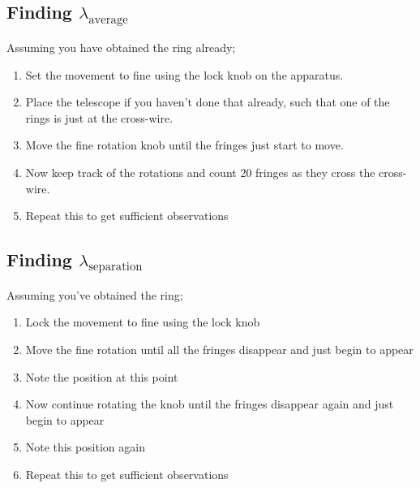 	\subsection{Finding $\lambda_\text{average}$}
		Assuming you have obtained the ring already;
		\begin{enumerate}
			\item Set the movement to fine using the lock knob on the apparatus.
			\item Place the telescope if you haven't done that already, such that one of the rings is just at the cross-wire.
			\item Move the fine rotation knob until the fringes just start to move.
			\item Now keep track of the rotations and count 20 fringes as they cross the cross-wire.
			\item Repeat this to get sufficient observations			
		\end{enumerate}
	\subsection{Finding $\lambda_\text{separation}$}
		Assuming you've obtained the ring;
		\begin{enumerate}
			\item Lock the movement to fine using the lock knob
			\item Move the fine rotation until all the fringes disappear and just begin to appear
			\item Note the position at this point
			\item Now continue rotating the knob until the fringes disappear again and just begin to appear
			\item Note this position again
			\item Repeat this to get sufficient observations
		\end{enumerate}